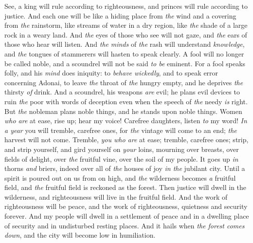\begin{biblechapter} %
 See, a king will rule according to righteousness, 
and princes will rule according to justice.
\verse And each one will be like a hiding place from \textit{the} wind 
and a covering from \textit{the} rainstorm, 
like streams of water in a dry region, 
like \textit{the} shade of a large rock in a weary land.
\verse And \textit{the} eyes of those who see will not gaze, 
and \textit{the} ears of those who hear will listen.
\verse And \textit{the} \textit{minds} of \textit{the} rash will understand \textit{knowledge}, 
and \textit{the} tongues of stammerers will hasten to speak clearly.
\verse A fool will no longer be called noble, 
and a scoundrel will not be said \textit{to be} eminent.
\verse For a fool speaks folly, 
and his \textit{mind} does iniquity: 
to \textit{behave wickedly}, 
and to speak error concerning Adonai, 
to leave \textit{the} throat of \textit{the} hungry empty, 
and he deprives \textit{the} thirsty \textit{of} drink.
\verse And a scoundrel, his weapons \textit{are} evil; 
he plans evil devices 
to ruin \textit{the} poor with words of deception 
even when the speech of \textit{the} needy \textit{is} right.
\verse But \textit{the} nobleman plans noble things, 
and he stands upon noble things.
 Women \textit{who are} at ease, rise up; hear my voice! 
Carefree daughters, listen \textit{to} my word!
\verse \textit{In a year} you will tremble, carefree ones,
\verse for \textit{the} vintage will come to an end; 
\textit{the} harvest will not come.
\verse Tremble, \textit{you who are} at ease; 
tremble, carefree ones; 
strip, and strip yourself, 
and gird yourself on \textit{your} loins,
\verse mourning over breasts, 
over fields of delight, 
over \textit{the} fruitful vine,
\verse over the soil of my people. 
It goes up \textit{in} thorns \textit{and} briers, 
indeed over all of \textit{the} houses of joy \textit{in the} jubilant city.
\verse Until a spirit is poured out on us from on high,
\verse and \textit{the} wilderness becomes \textit{a} fruitful field, 
and \textit{the} fruitful field is reckoned as the forest.
\verse Then justice will dwell in the wilderness, 
and righteousness will live in the fruitful field.
\verse And the work of righteousness will be peace, 
and the work of righteousness, quietness and security forever.
\verse And my people will dwell in a settlement of peace 
and in a dwelling place of security 
and in undisturbed resting places.
\verse And it hails when \textit{the forest comes down}, 
and the city will become low in humiliation.
\end{biblechapter}

